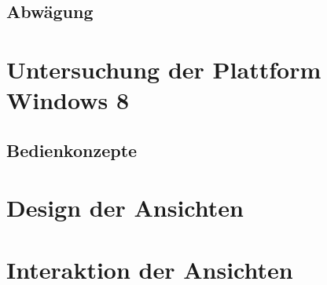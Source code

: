 \subsection{Abwägung}

\section{Untersuchung der Plattform Windows 8}
\subsection{Bedienkonzepte}



\section{Design der Ansichten}

\section{Interaktion der Ansichten}